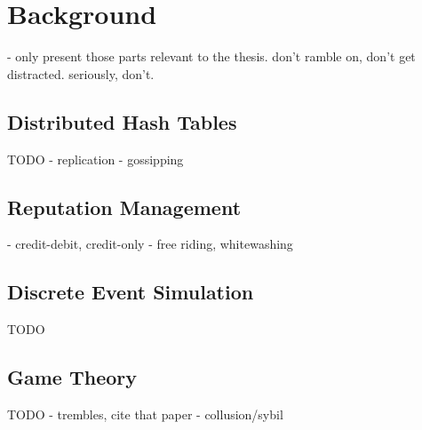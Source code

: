\chapter{Background}
\label{chap:background}
- only present those parts relevant to the thesis. don't ramble on, don't get
distracted. seriously, don't.
\section{Distributed Hash Tables}
TODO
- replication
- gossipping
\section{Reputation Management}
- credit-debit, credit-only
- free riding, whitewashing
\section{Discrete Event Simulation}
TODO
\section{Game Theory}
TODO
- trembles, cite that paper
- collusion/sybil
